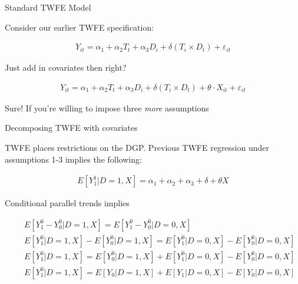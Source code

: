 \documentclass{beamer}
\begin{document}
\begin{frame}{Standard TWFE Model}

Consider our earlier TWFE specification:

\begin{eqnarray*}
Y_{it} = \alpha_1  + \alpha_2 T_t + \alpha_3 D_i +  \delta (T_i \times D_t)  + \varepsilon_{it}
\end{eqnarray*}

\bigskip

Just add in covariates then right?

\begin{eqnarray*}
Y_{it} = \alpha_1  + \alpha_2 T_t + \alpha_3 D_i  + \delta (T_i \times D_t) + \theta \cdot X_{it} + \varepsilon_{it}
\end{eqnarray*}

Sure! If you're willing to impose three \emph{more} assumptions

\end{frame}



\begin{frame}{Decomposing TWFE with covariates}

TWFE places restrictions on the DGP. Previous TWFE regression under assumptions 1-3 implies the following:

\bigskip

\begin{eqnarray*}
E[Y^1_1|D=1,X] = \alpha_1 + \alpha_2 + \alpha_3 + \delta + \theta X
\end{eqnarray*}

\bigskip

Conditional parallel trends implies

\small
\begin{eqnarray*}
&&E[Y^0_{1} - Y^0_{0}|D=1,X]= E[Y^0_{1} - Y^0_{0}|D=0,X] \\
&&E[Y^0_{1}|D=1,X] - E[Y^0_{0}|D=1,X]= E[Y^0_{1}|D=0,X] - E[Y^0_{0}|D=0,X] \\
&&E[Y^0_{1}|D=1,X] = E[Y^0_{0}|D=1,X] + E[Y^0_{1}|D=0,X] - E[Y^0_{0}|D=0,X] \\
&&E[Y^0_{1}|D=1,X] = E[Y_{0}|D=1,X] + E[Y_{1}|D=0,X] - E[Y_{0}|D=0,X] \\
\end{eqnarray*}


\end{frame}
\end{document}
